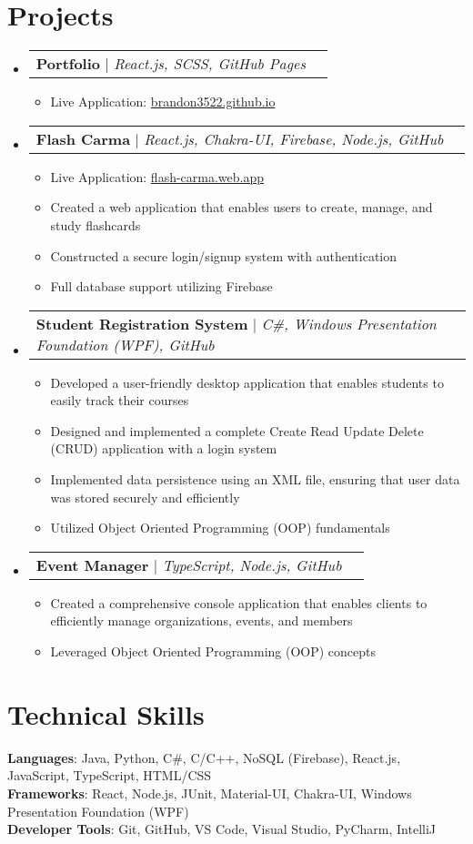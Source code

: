 \documentclass[letterpaper,11pt]{article}
\makeatletter
\newcommand{\resumeItem}[1]{
  \item\small{
    {#1 \vspace{-2pt}}
  }
}
\newcommand{\resumeProjectHeading}[2]{
    \item
    \begin{tabular*}{0.97\textwidth}{l@{\extracolsep{\fill}}r}
      \small#1 & #2 \\
    \end{tabular*}\vspace{-7pt}
}
\newcommand{\resumeSubHeadingListStart}{\begin{itemize}[leftmargin=0.15in, label={}]}
\newcommand{\resumeSubHeadingListEnd}{\end{itemize}}
\newcommand{\resumeItemListStart}{\begin{itemize}}
\newcommand{\resumeItemListEnd}{\end{itemize}\vspace{-5pt}}
\makeatother
\begin{document}
\section{Projects}
\resumeSubHeadingListStart
	\resumeProjectHeading
			{\textbf{Portfolio} $|$ \emph{React.js, SCSS, GitHub Pages}}{}
			\resumeItemListStart
				\resumeItem{Live Application: \href{https://brandon3522.github.io}{brandon3522.github.io}}
			\resumeItemListEnd
	\resumeProjectHeading
			{\textbf{Flash Carma} $|$ \emph{React.js, Chakra-UI, Firebase, Node.js, GitHub}}{}
			\resumeItemListStart
			\resumeItem{Live Application: \href{https://flash-carma.web.app}{flash-carma.web.app}}
				\resumeItem{Created a web application that enables users to create, manage, and study flashcards}
				\resumeItem{Constructed a secure login/signup system with authentication}
				\resumeItem{Full database support utilizing Firebase}
			\resumeItemListEnd
			\resumeProjectHeading
			{\textbf{Student Registration System} $|$ \emph{C\#, Windows Presentation Foundation (WPF), GitHub}}{}
			\resumeItemListStart
				\resumeItem{Developed a user-friendly desktop application that enables students to easily track their courses}
				\resumeItem{Designed and implemented a complete Create Read Update Delete (CRUD) application with a login system}
				\resumeItem{Implemented data persistence using an XML file, ensuring that user data was stored securely and efficiently}
				\resumeItem{Utilized Object Oriented Programming (OOP) fundamentals}
			\resumeItemListEnd
	\resumeProjectHeading
			{\textbf{Event Manager} $|$ \emph{TypeScript, Node.js, GitHub}}{}
			\resumeItemListStart
				\resumeItem{Created a comprehensive console application that enables clients to efficiently manage organizations, events, and members}
				\resumeItem{Leveraged Object Oriented Programming (OOP) concepts}
			\resumeItemListEnd
\resumeSubHeadingListEnd



%
\section{Technical Skills}
\begin{itemize}[leftmargin=0.15in, label={}]
\small{\item{
 \textbf{Languages}{: Java, Python, C\#, C/C++, NoSQL (Firebase), React.js, JavaScript, TypeScript, HTML/CSS} \\
 \textbf{Frameworks}{: React, Node.js, JUnit, Material-UI, Chakra-UI, Windows Presentation Foundation (WPF)} \\
 \textbf{Developer Tools}{: Git, GitHub, VS Code, Visual Studio, PyCharm, IntelliJ} \\
}}
\end{itemize}
\end{document}
